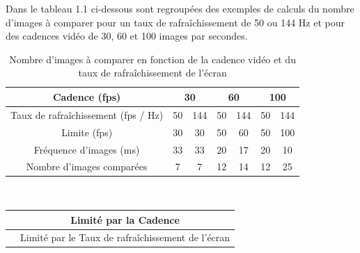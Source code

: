\documentclass[a4paper, 12pt]{report}
\begin{document}
Dans le tableau 1.1 ci-dessous sont regroupées des exemples de calculs du nombre d'images à comparer pour un taux de rafraîchissement de 50 ou 144 Hz et pour des cadences vidéo de 30, 60 et 100 images par secondes. 
\begin{center}
\begin{table}[!h]
\caption{Nombre d'images à comparer en fonction de la cadence vidéo et du taux de rafraîchissement de l'écran}
\vspace{0.5cm}
\begin{tabular}{|c|c|c|c|c|c|c|}
\hline
Cadence (fps) & \multicolumn{2}{c|}{30} & \multicolumn{2}{c|}{60} & \multicolumn{2}{c|}{100}\\
\hline
Taux de rafraîchissement (fps / Hz) & 50 & 144 & 50 & 144 & 50 & 144 \\
\hline
Limite (fps) & \cellcolor[RGB]{178,255,102} 30 & \cellcolor[RGB]{178,255,102} 30 & \cellcolor[RGB]{255,178,102} 50 & \cellcolor[RGB]{178,255,102} 60 & \cellcolor[RGB]{255,178,102} 50 & \cellcolor[RGB]{178,255,102} 100 \\
\hline
Fréquence d'images (ms) & 33 & 33 & 20 & 17 & 20 & 10 \\
\hline 
Nombre d'images comparées & 7 & 7 & 12 & 14 & 12 & 25 \\
\hline
\end{tabular}
\\
\end{table}
\end{center}
\begin{table}[!h]
\begin{tabular}{|c|c|}
\hline
\cellcolor[RGB]{178,255,102}{  } & Limité par la Cadence \\
\hline
\cellcolor[RGB]{255,178,102}{  } & Limité par le Taux de rafraîchissement de l'écran \\
\hline
\end{tabular}
\end{table}
    
    
    
\end{document}
